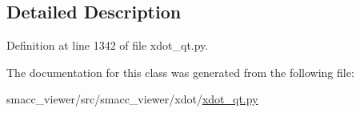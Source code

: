 \subsection{Detailed Description}


Definition at line 1342 of file xdot\+\_\+qt.\+py.



The documentation for this class was generated from the following file\+:\begin{DoxyCompactItemize}
\item 
smacc\+\_\+viewer/src/smacc\+\_\+viewer/xdot/\hyperlink{xdot__qt_8py}{xdot\+\_\+qt.\+py}\end{DoxyCompactItemize}

